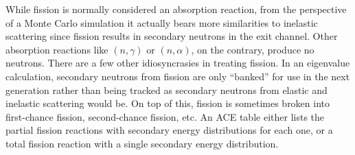 While fission is normally considered an absorption reaction, from the
perspective of a Monte Carlo simulation it actually bears more similarities to
inelastic scattering since fission results in secondary neutrons in the exit
channel. Other absorption reactions like $(n,\gamma)$ or $(n,\alpha)$, on the
contrary, produce no neutrons. There are a few other idiosyncrasies in treating
fission. In an eigenvalue calculation, secondary neutrons from fission are only
``banked'' for use in the next generation rather than being tracked as secondary
neutrons from elastic and inelastic scattering would be. On top of this, fission
is sometimes broken into first-chance fission, second-chance fission, etc. An
ACE table either lists the partial fission reactions with secondary energy
distributions for each one, or a total fission reaction with a single secondary
energy distribution.

